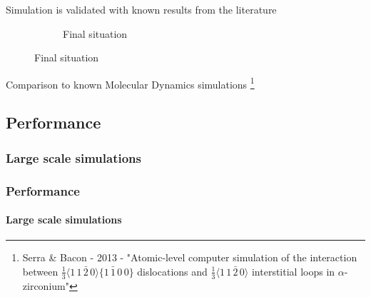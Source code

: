 \documentclass[aspectratio=1610,t,10pt]{beamer}
\newlength{\freeheight}
\begin{document}
\begin{frame}
\begin{block}{Simulation is validated with known results from the literature}
\begin{figure}
\begin{subfigure}{0.49\textwidth}
			\caption{Final situation}
		\end{subfigure}
	\end{figure}
	\centering
	Comparison to known Molecular Dynamics simulations \footnote{\tiny Serra \& Bacon - 2013 - "Atomic-level computer simulation of the interaction between $\frac{1}{3}\langle 1\,1\,\bar{2}\,0 \rangle\{1\,\bar{1}\,0\,0\}$ dislocations and $\frac{1}{3}\langle 1\,1\,\bar{2}\,0 \rangle$ interstitial loops in  $\alpha$-zirconium"}
	\end{block}
\end{frame}

\subsection{Performance}

\subsubsection{Large scale simulations}

\begin{frame}
\frametitle{Performance}
\framesubtitle{Large scale simulations}
\centering
{}
\end{frame}
\end{document}
